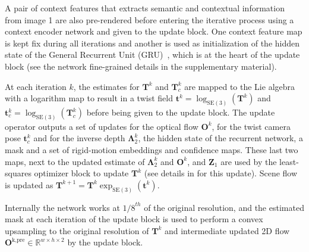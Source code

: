\documentclass{article}
\begin{document}
A pair of context features that extracts semantic and contextual information from image 1 are also pre-rendered before entering the iterative process using a context encoder network and given to the update block. One context feature map is kept fix during all iterations and another is used as initialization of the hidden state of the General Recurrent Unit (GRU)~\cite{cho2014properties}, which is at the heart of the update block (see the network fine-grained details in the supplementary material). 

At each iteration $k$, the estimates for $\mathbf{T}^k$ and $\mathbf{T}_c^k$ are mapped to the Lie algebra with a logarithm map to result in a twist field $\mathbf{t}^k = \log_{\ensuremath{\mathrm{SE}(3)}}(\mathbf{T}^k)$ and $\mathbf{t}_c^k = \log_{\ensuremath{\mathrm{SE}(3)}}(\mathbf{T}_c^k)$ before being given to the update block. The update operator outputs a set of updates for the optical flow $\mathbf{O}^k$, for the twist camera pose $\mathbf{t}_c^k$ and for the inverse depth $\mathbf{\Lambda}_2^k$, the hidden state of the recurrent network, a mask and a set of rigid-motion embeddings and confidence maps. These last two maps, next to the updated estimate of $\mathbf{\Lambda}_2^k$ and $\mathbf{O}^k$, and $\mathbf{Z}_1$ are used by the least-squares optimizer block to update $\mathbf{T}^k$ (see details in \cite{teed2021raft} for this update). Scene flow is updated as $\mathbf{T}^{k+1} = \mathbf{T}^k \exp_{\ensuremath{\mathrm{SE}(3)}}(\mathbf{t}^k)$.

Internally the network works at ${1/8}^{th}$ of the original resolution, and the estimated mask at each iteration of the update block is used to perform a convex upsampling to the original resolution of $\mathbf{T}^k$ and intermediate updated 2D flow $\mathbf{O}^\text{k,pre} \in \mathbb{R}^{w\times h\times 2}$ by the update block. 
\end{document}

